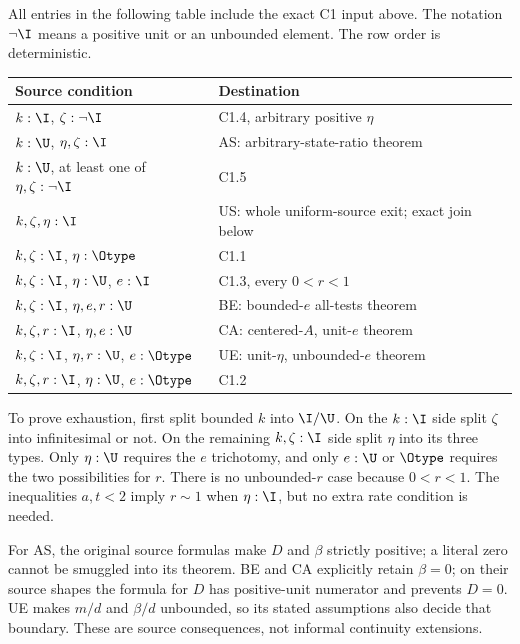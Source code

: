 All entries in the following table include the exact C1 input above.
The notation $\neg\I$ means a positive unit or an unbounded element.
The row order is deterministic.
\begin{longtable}{p{.57\linewidth}p{.35\linewidth}}
\toprule Source condition & Destination \\\midrule
$k:\I$, $\zeta:\neg\I$ & C1.4, arbitrary positive $\eta$ \\
$k:\U$, $\eta,\zeta:\I$ & AS: arbitrary-state-ratio theorem \\
$k:\U$, at least one of $\eta,\zeta:\neg\I$ & C1.5 \\
$k,\zeta,\eta:\I$ & US: whole uniform-source exit; exact join below \\
$k,\zeta:\I$, $\eta:\Otype$ & C1.1 \\
$k,\zeta:\I$, $\eta:\U$, $e:\I$ & C1.3, every $0<r<1$ \\
$k,\zeta:\I$, $\eta,e,r:\U$ & BE: bounded-$e$ all-tests theorem \\
$k,\zeta,r:\I$, $\eta,e:\U$ & CA: centered-$A$, unit-$e$ theorem \\
$k,\zeta:\I$, $\eta,r:\U$, $e:\Otype$ & UE: unit-$\eta$, unbounded-$e$ theorem \\
$k,\zeta,r:\I$, $\eta:\U$, $e:\Otype$ & C1.2 \\
\bottomrule
\end{longtable}
To prove exhaustion, first split bounded $k$ into $\I/\U$. On the
$k:\I$ side split $\zeta$ into infinitesimal or not. On the remaining
$k,\zeta:\I$ side split $\eta$ into its three types. Only
$\eta:\U$ requires the $e$ trichotomy, and only $e:\U$ or
$\Otype$ requires the two possibilities for $r$. There is no
unbounded-$r$ case because $0<r<1$. The inequalities $a,t<2$ imply
$r\sim1$ when $\eta:\I$, but no extra rate condition is needed.

For AS, the original source formulas make $D$ and $\beta$ strictly
positive; a literal zero cannot be smuggled into its theorem. BE and CA
explicitly retain $\beta=0$; on their source shapes the formula for
$D$ has positive-unit numerator and prevents $D=0$. UE makes
$m/d$ and $\beta/d$ unbounded, so its stated assumptions also decide
that boundary. These are source consequences, not informal continuity
extensions.

